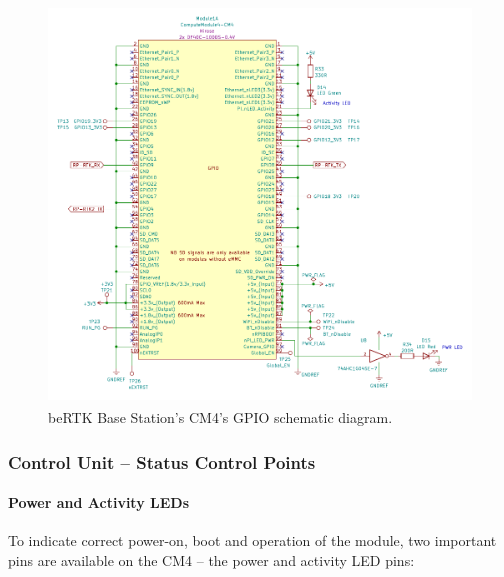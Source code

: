 \begin{figure}[h]
	\centering
	\includegraphics[width=1.0\textwidth]{Chapters/Figures/chapter3/CM4_GPIO.pdf}
	\caption{beRTK\textsuperscript{\textregistered} Base Station's CM4's GPIO schematic diagram.}
	\label{fig:CM4_GPIO_circuit}
\end{figure}


\subsubsection{Control Unit -- Status Control Points}\label{sec:3223_CM4_CTRL_POINTS}

\paragraph{Power and Activity LEDs}	To indicate correct power-on, boot and operation of the module, two important pins are available on the CM4 -- the power and activity LED pins:


